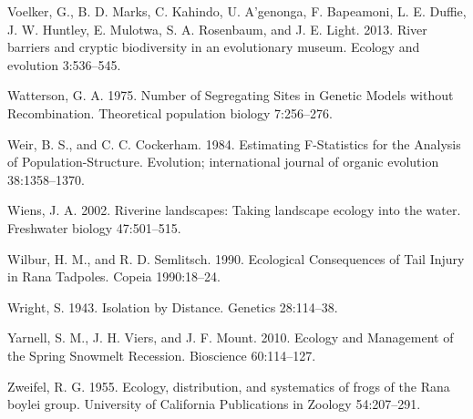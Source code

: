 \documentclass[twoside,12pt,final]{ucthesis-CA2012} %
\begin{document}
\begin{ucmainmatter}
\leavevmode\hypertarget{ref-voelker_river_2013}{}%
Voelker, G., B. D. Marks, C. Kahindo, U. A'genonga, F. Bapeamoni, L. E.
Duffie, J. W. Huntley, E. Mulotwa, S. A. Rosenbaum, and J. E. Light.
2013. River barriers and cryptic biodiversity in an evolutionary museum.
Ecology and evolution 3:536--545.

\leavevmode\hypertarget{ref-watterson_number_1975}{}%
Watterson, G. A. 1975. Number of Segregating Sites in Genetic Models
without Recombination. Theoretical population biology 7:256--276.

\leavevmode\hypertarget{ref-weir_estimating_1984}{}%
Weir, B. S., and C. C. Cockerham. 1984. Estimating F-Statistics for the
Analysis of Population-Structure. Evolution; international journal of
organic evolution 38:1358--1370.

\leavevmode\hypertarget{ref-wiens_riverine_2002}{}%
Wiens, J. A. 2002. Riverine landscapes: Taking landscape ecology into
the water. Freshwater biology 47:501--515.

\leavevmode\hypertarget{ref-wilbur_ecological_1990}{}%
Wilbur, H. M., and R. D. Semlitsch. 1990. Ecological Consequences of
Tail Injury in Rana Tadpoles. Copeia 1990:18--24.

\leavevmode\hypertarget{ref-wright_isolation_1943}{}%
Wright, S. 1943. Isolation by Distance. Genetics 28:114--38.

\leavevmode\hypertarget{ref-yarnell_ecology_2010}{}%
Yarnell, S. M., J. H. Viers, and J. F. Mount. 2010. Ecology and
Management of the Spring Snowmelt Recession. Bioscience 60:114--127.

\leavevmode\hypertarget{ref-zweifel_ecology_1955}{}%
Zweifel, R. G. 1955. Ecology, distribution, and systematics of frogs of
the Rana boylei group. University of California Publications in Zoology
54:207--291.

\end{ucmainmatter}
\end{document}
